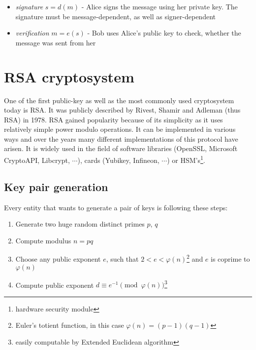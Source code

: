 \begin{itemize}

\item \textit{signature} $s = d(m)$ - Alice signs the message using her private key. The signature must be message-dependent, as well as signer-dependent

\item \textit{verification} $m = e(s)$ - Bob uses Alice’s public key to check, whether the message was sent from her

\end{itemize}

\section{RSA cryptosystem}

One of the first public-key as well as the most commonly used cryptosystem today is RSA. It was publicly described by Rivest, Shamir and Adleman (thus RSA) in 1978\cite{rsa_paper}. RSA gained popularity because of its simplicity as it uses relatively simple power modulo operations. It can be implemented in various ways and over the years many different implementations of this protocol have arisen. It is widely used in the field of software libraries (OpenSSL, Microsoft CryptoAPI, Libcrypt, $\cdots$), cards (Yubikey, Infineon, $\cdots$) or HSM's\footnote{hardware security module}.


\subsection*{Key pair generation}

Every entity that wants to generate a pair of keys is following these steps:

\begin{enumerate}

\item Generate two huge random distinct primes $p$, $q$
\item Compute modulus $n = pq$
\item Choose any public exponent $e$, such that $2 < e < \varphi(n)$\footnote{Euler's totient function, in this case $\varphi(n) = (p-1)(q-1)$} and $e$ is coprime to $\varphi(n)$
\item Compute public exponent $d \equiv e^{-1} \pmod{\varphi(n)}$\footnote{easily computable by Extended Euclidean algorithm}

\end{enumerate}

